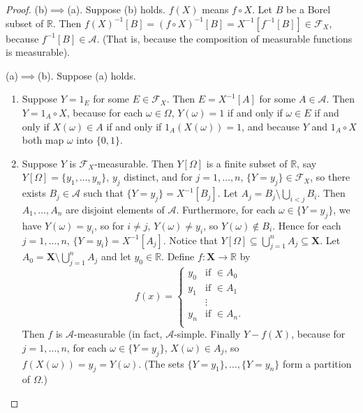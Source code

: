 \documentclass{article}
\newcommand{\R}{\mathbb{R}}
\newcommand{\F}{\mathscr{F}}
\theoremstyle{definition}
\begin{document}
\begin{proof}
    (b)$\implies$(a). Suppose (b) holds. $f(X)$ means $f \circ X$. Let $B$ be a Borel subset of $\R$. Then $f(X)^{-1}[B] = (f \circ X)^{-1}[B] = X^{-1}[f^{-1}[B]] \in \F_X$, because $f^{-1}[B] \in \mathscr{A}$. (That is, because the composition of measurable functions is measurable).
    
    (a)$\implies$(b). Suppose (a) holds.
    \begin{enumerate}[(1)]
        \item Suppose $Y = 1_E$ for some $E \in \F_X$. Then $E = X^{-1}[A]$ for some $A \in \mathscr{A}$. Then $Y = 1_A \circ X$, because for each $\omega \in \Omega$, $Y(\omega) = 1$ if and only if $\omega \in E$ if and only if $X(\omega) \in A$ if and only if $1_A(X(\omega)) = 1$, and because $Y$ and $1_A \circ X$ both map $\omega$ into $\{0, 1\}$.
        \item Suppose $Y$ is $\F_X$-measurable. Then $Y[\Omega]$ is a finite subset of $\R$, say $Y[\Omega] = \{y_1, \dots, y_n\}$, $y_j$ distinct, and for $j = 1, \dots, n$, $\{Y = y_j\} \in \F_X$, so there exists $B_j \in \mathscr{A}$ such that $\{Y = y_j\} = X^{-1}[B_j]$. Let $A_j = B_j \setminus \bigcup_{i < j} B_i$. Then $A_1, \dots, A_n$ are disjoint elements of $\mathscr{A}$. Furthermore, for each $\omega \in \{Y = y_j\}$, we have $Y(\omega) = y_i$, so for $i \neq j$, $Y(\omega) \neq y_i$, so $Y(\omega) \notin B_i$. Hence for each $j = 1, \dots, n$, $\{Y = y_i\} = X^{-1}[A_j]$. Notice that $Y[\Omega] \subseteq \bigcup_{j=1}^n A_j \subseteq \mathbf{X}$. Let $A_0 = \mathbf{X} \setminus \bigcup_{j=1}^n A_j$ and let $y_0 \in \R$. Define $f : \mathbf{X} \to \R$ by
        \[
            f(x) = \begin{cases}
                y_0 & \text{if }  \in A_0 \\
                y_1 & \text{if }  \in A_1 \\
                & \vdots \\
                y_n & \text{if }  \in A_n. \\
            \end{cases}
        \]
        Then $f$ is $\mathscr{A}$-measurable (in fact, $\mathscr{A}$-simple. Finally $Y - f(X)$, because for $j = 1, \dots, n$, for each $\omega \in \{Y = y_j\}$, $X(\omega) \in A_j$, so $f(X(\omega)) = y_j = Y(\omega)$. (The sets $\{Y = y_1\}, \dots, \{Y = y_n\}$ form a partition of $\Omega$.)

\end{enumerate}
\end{proof}
\end{document}
